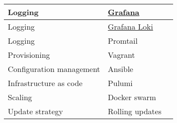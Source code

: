 \begin{longtable}{|p{}|p{} | p{}|}
         \hline
         Logging & \href{https://grafana.com/}{Grafana} & \\
         \hline
         Logging & \href{https://grafana.com/docs/loki/latest/}{Grafana Loki} & \\
         \hline
         Logging & Promtail & \\
         \hline
         Provisioning & Vagrant & \\
         \hline
         Configuration management & Ansible & \\
         \hline
         Infrastructure as code & Pulumi & \\
         \hline
         Scaling & Docker swarm & \\
         \hline
         Update strategy & Rolling updates & \\
         \hline
\end{longtable}

